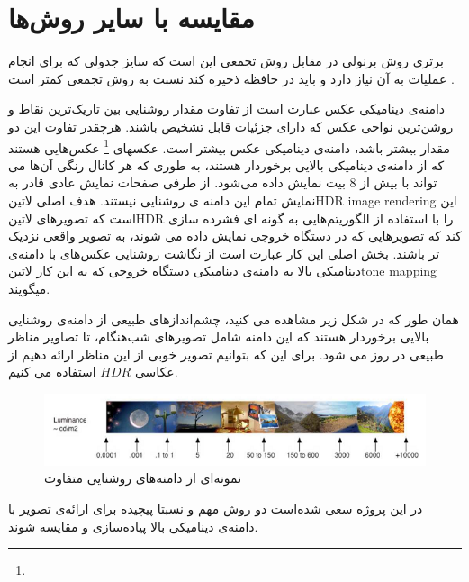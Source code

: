 \section{ مقایسه با سایر روش‌ها}
برتری روش برنولی در مقابل روش تجمعی این است که سایز جدولی که برای انجام عملیات به آن نیاز دارد و باید در حافظه ذخیره کند نسبت به روش تجمعی کمتر است . 







دامنه‌ی دینامیکی
عکس عبارت است از تفاوت مقدار روشنایی بین تاریک‌ترین نقاط و روشن‌ترین نواحی عکس که دارای جزئیات قابل تشخیص باشند. هرچقدر تفاوت این دو مقدار بیشتر باشد، دامنه‌ی دینامیکی عکس بیشتر است. عکسهای
\footnote{}
   عکس‌هایی هستند که از دامنه‌ی دینامیکی بالایی برخوردار هستند، به طوری که هر کانال رنگی آن‌ها می تواند با بیش از 8 بیت نمایش داده می‌شود. 
از طرفی صفحات نمایش عادی قادر به نمایش تمام این دامنه ی روشنایی نیستند. 
هدف اصلی 
‌لاتین{HDR image rendering }
 این است که تصویر‌های 
 ‌لاتین{HDR }
 را با استفاده از الگوریتم‌هایی به  گونه ای فشرده سازی کند که تصویر‌هایی که در دستگاه خروجی نمایش داده می شوند، به تصویر واقعی نزدیک تر باشند.
بخش اصلی این کار عبارت است از نگاشت روشنایی عکس‌های با دامنه‌ی دینامیکی بالا به دامنه‌ی دینامیکی دستگاه خروجی که به این کار 
 ‌لاتین{tone mapping }
 میگویند.
 
همان طور که در شکل زیر مشاهده می کنید، چشم‌اندازهای طبیعی از دامنه‌ی روشنایی بالایی برخوردار هستند که این دامنه شامل تصویرهای شب‌هنگام، تا تصاویر مناظر طبیعی در روز می شود. برای این که بتوانیم تصویر خوبی از این مناظر ارائه دهیم از عکاسی $HDR$ استفاده می کنیم.
 
 \begin{figure}[!htb]
 	\includegraphics[width=\linewidth]{images/luminancerange}
 	\caption{نمونه‌ای از دامنه‌های روشنایی متفاوت}\label{fig:logtonemap}

 	\endminipage\hfill
 \end{figure}
 


 در این پروژه سعی شده‌است دو  روش  مهم و نسبتا پیچیده برای ارائه‌ی تصویر با دامنه‌ی دینامیکی بالا پیاده‌سازی و مقایسه شوند.
 
